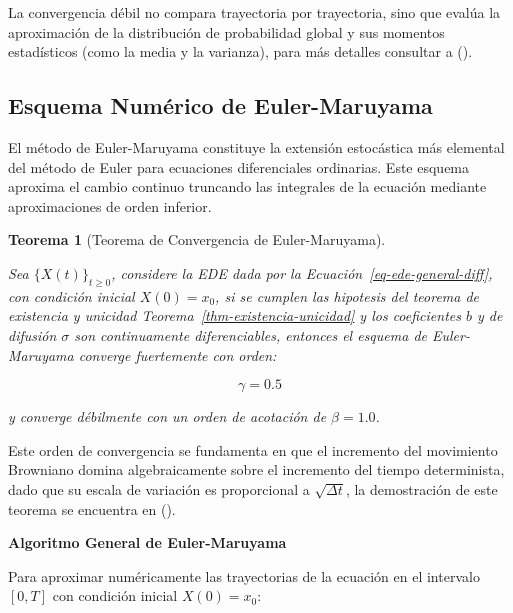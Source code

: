 \documentclass[
  spanish,
  letterpaper,
  DIV=11,
  numbers=noendperiod]{scrreprt}
\theoremstyle{plain}
\newtheorem{theorem}{Teorema}[chapter]
\theoremstyle{definition}
\theoremstyle{remark}
\begin{document}
La convergencia débil no compara trayectoria por trayectoria, sino que
evalúa la aproximación de la distribución de probabilidad global y sus
momentos estadísticos (como la media y la varianza), para más detalles
consultar a ().

\subsection{Esquema Numérico de
Euler-Maruyama}\label{sec-euler-maruyama}

El método de Euler-Maruyama constituye la extensión estocástica más
elemental del método de Euler para ecuaciones diferenciales ordinarias.
Este esquema aproxima el cambio continuo truncando las integrales de la
ecuación mediante aproximaciones de orden inferior.

\begin{theorem}[Teorema de Convergencia de
Euler-Maruyama]\protect\hypertarget{thm-euler-maruyama}{}\label{thm-euler-maruyama}

Sea \(\{X(t)\}_{t \ge 0}\), considere la EDE dada por la
Ecuación~\ref{eq-ede-general-diff}, con condición inicial
\(X(0) = x_0\), si se cumplen las hipotesis del teorema de existencia y
unicidad Teorema~\ref{thm-existencia-unicidad} y los coeficientes \(b\)
y de difusión \(\sigma\) son continuamente diferenciables, entonces el
esquema de Euler-Maruyama converge fuertemente con orden:

\[
\gamma = 0.5
\]

y converge débilmente con un orden de acotación de \(\beta = 1.0\).

\end{theorem}

Este orden de convergencia se fundamenta en que el incremento del
movimiento Browniano domina algebraicamente sobre el incremento del
tiempo determinista, dado que su escala de variación es proporcional a
\(\sqrt{\Delta t}\), la demostración de este teorema se encuentra en
().

\textbf{Algoritmo General de Euler-Maruyama}

Para aproximar numéricamente las trayectorias de la ecuación en el
intervalo \([0, T]\) con condición inicial \(X(0) = x_0\):
\end{document}
